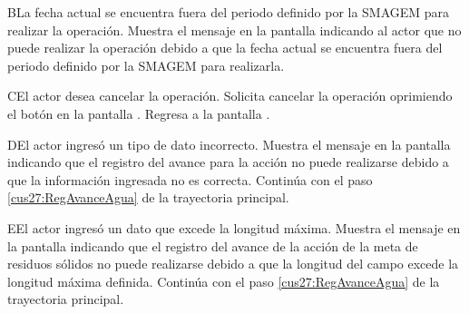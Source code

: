  \begin{UCtrayectoriaA}{B}{La fecha actual se encuentra fuera del periodo definido por la SMAGEM para realizar la operación.}
    \UCpaso[\UCsist] Muestra el mensaje  en la pantalla  indicando al actor que no puede realizar la operación debido a que la fecha actual se encuentra fuera del periodo definido por la SMAGEM para realizarla. 
 \end{UCtrayectoriaA}
 
    \begin{UCtrayectoriaA}{C}{El actor desea cancelar la operación.}
      \UCpaso[\UCactor] Solicita cancelar la operación oprimiendo el botón  en la pantalla .
      \UCpaso[] Regresa a la pantalla . 
    \end{UCtrayectoriaA}
    
    \begin{UCtrayectoriaA}{D}{El actor ingresó un tipo de dato incorrecto.}    
	\UCpaso[\UCsist] Muestra el mensaje  en la pantalla  indicando que el registro del avance para la acción no puede realizarse debido a que la información ingresada no es correcta.
	\UCpaso[] Continúa con el paso \ref{cus27:RegAvanceAgua} de la trayectoria principal.     
    \end{UCtrayectoriaA}
    
    \begin{UCtrayectoriaA}{E}{El actor ingresó un dato que excede la longitud máxima.}    
	\UCpaso[\UCsist] Muestra el mensaje  en la pantalla  indicando que el registro del avance de la acción de la meta de residuos sólidos no puede realizarse debido a que la longitud del campo excede la longitud máxima definida.
	\UCpaso[] Continúa con el paso \ref{cus27:RegAvanceAgua} de la trayectoria principal.     
    \end{UCtrayectoriaA}
 